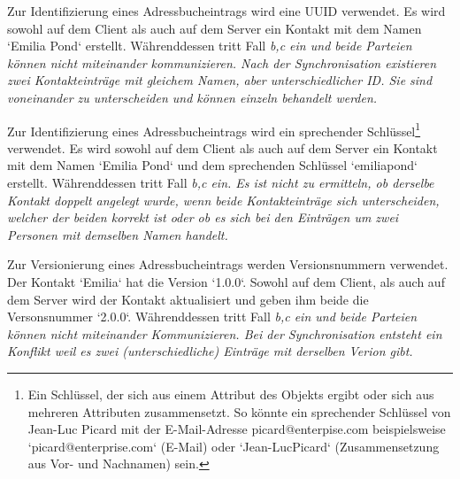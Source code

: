 %
%
\def \naturalkey {Ein Schlüssel, der sich aus einem Attribut des Objekts ergibt oder sich aus mehreren Attributen zusammensetzt. So könnte ein sprechender Schlüssel von Jean-Luc Picard mit der E-Mail-Adresse picard@enterpise.com beispielsweise `picard@enterprise.com` (E-Mail) oder `Jean-LucPicard` (Zusammensetzung aus Vor- und Nachnamen) sein.}
\def \logicalclock {Eine Logische Uhr ist eine Komponente die dazu dient, dem Datenobjekt einen eindeutigen Zeitstempel zuzuweisen. Die bekanntesten Verfahren für Logische Uhren in verteilten Systemen sind die Lamport-Uhr und die Vektoruhr. Beide verwenden Zähler die sich bei jedem Ereignis erhöhen. Einfach gesagt besteht die Lamport-Uhr aus einem Zeitstempel und einem Zähler, die Vektoruhr aus einem Zeitstempel und einem Vektor -- einer Liste aus Zählern.}
%
%
\begin{description}[leftmargin=0.5cm,style=nextline]
  \item[Szenario ID0:]
  Zur Identifizierung eines Adressbucheintrags wird eine \gls{UUID} verwendet. Es wird sowohl auf dem Client als auch auf dem Server ein Kontakt mit dem Namen `Emilia Pond` erstellt. Währenddessen tritt Fall \it{b,c} ein und beide Parteien können nicht miteinander kommunizieren. Nach der Synchronisation existieren zwei Kontakteinträge mit gleichem Namen, aber unterschiedlicher ID. Sie sind voneinander zu unterscheiden und können einzeln behandelt werden.\\
  \item[Szenario ID1:]
  Zur Identifizierung eines Adressbucheintrags wird ein sprechender Schlüssel\footnote{\naturalkey} verwendet.
  Es wird sowohl auf dem Client als auch auf dem Server ein Kontakt mit dem Namen `Emilia Pond` und dem sprechenden Schlüssel `emiliapond` erstellt. Währenddessen tritt Fall \it{b,c} ein. Es ist nicht zu ermitteln, ob derselbe Kontakt doppelt angelegt wurde, wenn beide Kontakteinträge sich unterscheiden, welcher der beiden korrekt ist oder ob es sich bei den Einträgen um zwei Personen mit demselben Namen handelt.\\
  \item[Szenario V0:]
  Zur Versionierung eines Adressbucheintrags werden Versionsnummern verwendet. Der Kontakt `Emilia` hat die Version `1.0.0`. Sowohl auf dem Client, als auch auf dem Server wird der Kontakt aktualisiert und geben ihm beide die Versonsnummer `2.0.0`. Währenddessen tritt Fall \it{b,c} ein und beide Parteien können nicht miteinander Kommunizieren. Bei der Synchronisation entsteht ein Konflikt weil es zwei (unterschiedliche) Einträge mit derselben Verion gibt.\\

\end{description}
